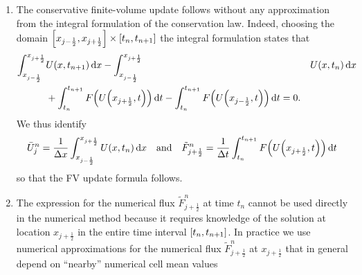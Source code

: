 \begin{remark}
	\begin{enumerate}
		\item The conservative finite-volume update follows without any approximation from the integral formulation of the conservation law.
		Indeed, choosing the domain \(\brackets*{x_{j - \frac{1}{2}}, x_{j + \frac{1}{2}}} \times \brackets*{t_n, t_{n + 1}}\) the integral formulation states that
		\begin{align*}
			\int_{x_{j - \frac{1}{2}}}^{x_{j + \frac{1}{2}}}&U\parentheses*{x, t_{n + 1}}\d x - \int_{x_{j - \frac{1}{2}}}^{x_{j + \frac{1}{2}}}&U\parentheses*{x, t_n}\d x\\
			&+ \int_{t_n}^{t_{n + 1}}F\parentheses*{U\parentheses*{x_{j + \frac{1}{2}}, t}}\d t - \int_{t_n}^{t_{n + 1}}F\parentheses*{U\parentheses*{x_{j - \frac{1}{2}}, t}}\d t = 0.
		\end{align*}
		We thus identify
		\[
			\bar{U}_j^n = \frac{1}{\Delta x}\int_{x_{j - \frac{1}{2}}}^{x_{j + \frac{1}{2}}}U\parentheses*{x, t_n}\d x \quad \text{and} \quad \tilde{F}_{j + \frac{1}{2}}^n = \frac{1}{\Delta t}\int_{t_n}^{t_{n + 1}}F\parentheses*{U\parentheses*{x_{j + \frac{1}{2}}, t}}\d t
		\]
		so that the FV update formula follows.
		\begin{center}
		\end{center}
		\item The expression for the numerical flux \(\tilde{F}_{j + \frac{1}{2}}^n\) at time \(t_n\) cannot be used directly in the numerical method because it requires knowledge of the solution at location \(x_{j + \frac{1}{2}}\) in the entire time interval \(\brackets*{t_n, t_{n + 1}}\).
		In practice we use numerical approximations for the numerical flux \(\tilde{F}_{j + \frac{1}{2}}^n\) at \(x_{j + \frac{1}{2}}\) that in general depend on ``nearby'' numerical cell mean values

\end{enumerate}
\end{remark}
